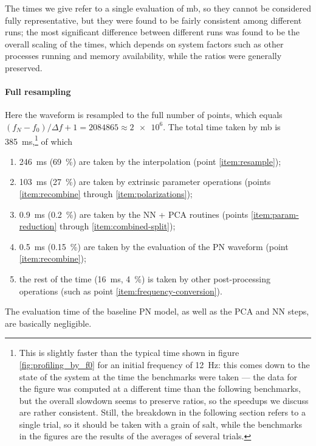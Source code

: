 \documentclass[main.tex]{subfiles}
\begin{document}
The times we give refer to a single evaluation of \ac{mb}, so they cannot be considered fully representative, but they were found to be fairly consistent among different runs; the most significant difference between different runs was found to be the overall scaling of the times, which depends on system factors such as other processes running and memory availability, while the ratios were generally preserved.

\paragraph{Full resampling}
Here the waveform is resampled to the full number of points, which equals \((f_N - f_0 ) / \Delta f + 1 = 2084865 \approx \num{2e6}\). 
The total time taken by \ac{mb} is \SI{385}{ms},\footnote{This is slightly faster than the typical time shown in figure \ref{fig:profiling_by_f0} for an initial frequency of \SI{12}{Hz}: this comes down to the state of the system at the time the benchmarks were taken --- the data for the figure was computed at a different time than the following benchmarks, but the overall slowdown seems to preserve ratios, so the speedups we discuss are rather consistent.
Still, the breakdown in the following section refers to a single trial, so it should be taken with a grain of salt, while the benchmarks in the figures are the results of the averages of several trials.} of which 
\begin{enumerate}
    \item \SI{246}{ms} (\SI{69}{\%}) are taken by the interpolation (point \ref{item:resample});
    \item \SI{103}{ms} (\SI{27}{\%}) are taken by extrinsic parameter operations (points \ref{item:recombine} through \ref{item:polarizations});
    \item \SI{0.9}{ms} (\SI{0.2}{\%}) are taken by the \ac{NN} + \ac{PCA} routines (points \ref{item:param-reduction} through \ref{item:combined-split});
    \item \SI{0.5}{ms} (\SI{0.15}{\%}) are taken by the evaluation of the \ac{PN} waveform (point \ref{item:recombine});
    \item the rest of the time (\SI{16}{ms}, \SI{4}{\%}) is taken by other post-processing operations (such as point \ref{item:frequency-conversion}).
\end{enumerate}

The evaluation time of the baseline \ac{PN} model, as well as the \ac{PCA} and \ac{NN} steps, are basically negligible. 
\end{document}
